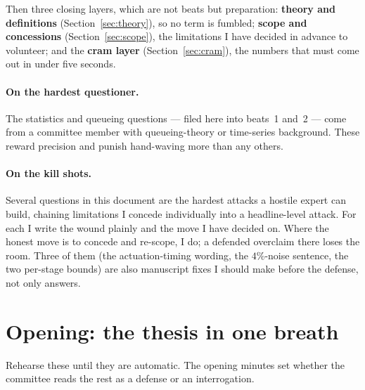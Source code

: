 \documentclass[11pt,a4paper]{article}
\begin{document}
Then three closing layers, which are not beats but preparation:
\textbf{theory and definitions} (Section~\ref{sec:theory}), so no term is
fumbled; \textbf{scope and concessions} (Section~\ref{sec:scope}), the
limitations I have decided in advance to volunteer; and the \textbf{cram
layer} (Section~\ref{sec:cram}), the numbers that must come out in under
five seconds.

\paragraph{On the hardest questioner.} The statistics and queueing questions
--- filed here into beats~1 and~2 --- come from a committee member with
queueing-theory or time-series background. These reward precision and punish
hand-waving more than any others.

\paragraph{On the kill shots.} Several questions in this document are the
hardest attacks a hostile expert can build, chaining limitations I concede
individually into a headline-level attack. For each I write the wound plainly
and the move I have decided on. Where the honest move is to concede and
re-scope, I do; a defended overclaim there loses the room. Three of them (the
actuation-timing wording, the $4\%$-noise sentence, the two per-stage bounds)
are also manuscript fixes I should make before the defense, not only answers.
\tableofcontents
\clearpage

\section{Opening: the thesis in one breath}

Rehearse these until they are automatic. The opening minutes set whether the
committee reads the rest as a defense or an interrogation.
\end{document}
